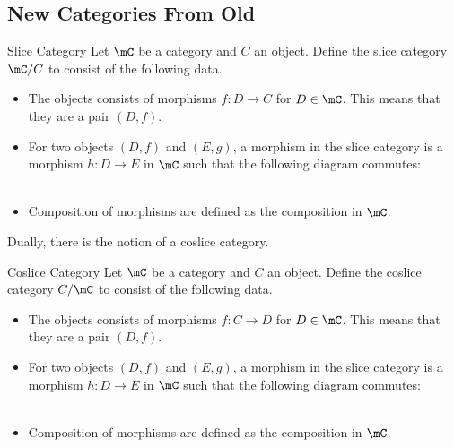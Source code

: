 \documentclass[a4paper]{article}
\begin{document}
\subsection{New Categories From Old}
\begin{defn}{Slice Category}{} Let $\mC$ be a category and $C$ an object. Define the slice category $\mC/C$ to consist of the following data. 
\begin{itemize}
\item The objects consists of morphisms $f:D\to C$ for $D\in\mC$. This means that they are a pair $(D,f)$. 
\item For two objects $(D,f)$ and $(E,g)$, a morphism in the slice category is a morphism $h:D\to E$ in $\mC$ such that the following diagram commutes: \\
\\
\item Composition of morphisms are defined as the composition in $\mC$. 
\end{itemize}
\end{defn}

Dually, there is the notion of a coslice category. 

\begin{defn}{Coslice Category}{} Let $\mC$ be a category and $C$ an object. Define the coslice category $C/\mC$ to consist of the following data. 
\begin{itemize}
\item The objects consists of morphisms $f:C\to D$ for $D\in\mC$. This means that they are a pair $(D,f)$. 
\item For two objects $(D,f)$ and $(E,g)$, a morphism in the slice category is a morphism $h:D\to E$ in $\mC$ such that the following diagram commutes: \\
\\
\item Composition of morphisms are defined as the composition in $\mC$. 
\end{itemize}
\end{defn}
\end{document}
